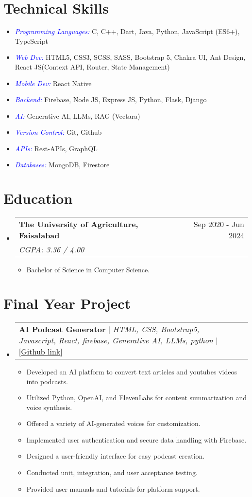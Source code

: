 \documentclass[letterpaper,11pt]{article}
\makeatletter
\newcommand{\resumeItem}[1]{
  \item\small{
    {#1 \vspace{-2pt}}
  }
}
\newcommand{\resumeSubheading}[4]{
  \vspace{-2pt}\item
    \begin{tabular*}{0.97\textwidth}[t]{l@{\extracolsep{\fill}}r}
      \textbf{#1} & #2 \\
      \textit{\small#3} & \textit{\small #4} \\
    \end{tabular*}\vspace{-7pt}
}
\newcommand{\resumeProjectHeading}[2]{
    \item
    \begin{tabular*}{0.97\textwidth}{l@{\extracolsep{\fill}}r}
      \small#1 & #2 \\
    \end{tabular*}\vspace{-7pt}
}
\newcommand{\resumeSubHeadingListStart}{\begin{itemize}[leftmargin=0.15in, label={}]}
\newcommand{\resumeSubHeadingListEnd}{\end{itemize}}
\newcommand{\resumeItemListStart}{\begin{itemize}}
\newcommand{\resumeItemListEnd}{\end{itemize}\vspace{-5pt}}
\makeatother
\begin{document}
\section{\textbf{Technical Skills}}
\resumeItemListStart
\resumeItem{\textcolor{blue}{\itshape \textcolor{blue}{\itshape Programming Languages:}}{ C, C++, Dart, Java, Python, JavaScript (ES6+), TypeScript } \\}
\resumeItem{\textcolor{blue}{\itshape Web Dev:}{ HTML5, CSS3, SCSS, SASS, Bootstrap 5, Chakra UI, Ant Design, React JS(Context API, Router, State Management)} \\}
\resumeItem{\textcolor{blue}{\itshape Mobile Dev:}{ React Native} \\}
\resumeItem{\textcolor{blue}{\itshape Backend:}{ Firebase, Node JS, Express JS, Python, Flask, Django} \\}
\resumeItem{\textcolor{blue}{\itshape AI:}{ Generative AI, LLMs, RAG (Vectara)} \\}
\resumeItem{\textcolor{blue}{\itshape Version Control:}{ Git, Github} \\}
\resumeItem{\textcolor{blue}{\itshape APIs:}{ Rest-APIs, GraphQL} \\}
\resumeItem{\textcolor{blue}{\itshape Databases:}{ MongoDB, Firestore}\\}
\resumeItemListEnd
%

\section{\textbf{Education}}
\resumeSubHeadingListStart
\resumeSubheading
{The University of Agriculture, Faisalabad}{Sep 2020 - Jun 2024}
{CGPA: 3.36 / 4.00}{}
{}{}
\resumeItemListStart
\resumeItem{Bachelor of Science in Computer Science.}
\resumeItemListEnd
\resumeSubHeadingListEnd

\section{\textbf{Final Year Project}}
\resumeSubHeadingListStart

\resumeProjectHeading
{\textbf{{AI Podcast Generator}} $|$ \emph{HTML, CSS, Bootstrap5, Javascript, React, firebase, Generative AI, LLMs, python} $|$ [{\href{https://github.com/Ahmadjajja/AIpodcastgenerator}{\underline{Github link}}}]} {}
\resumeItemListStart
\resumeItem{Developed an AI platform to convert text articles and youtubes videos into podcasts.}
\resumeItem{Utilized Python, OpenAI, and ElevenLabs for content summarization and voice synthesis.}
\resumeItem{Offered a variety of AI-generated voices for customization.}
\resumeItem{Implemented user authentication and secure data handling with Firebase.}
\resumeItem{Designed a user-friendly interface for easy podcast creation.}
\resumeItem{Conducted unit, integration, and user acceptance testing.}
\resumeItem{Provided user manuals and tutorials for platform support.}
\resumeItemListEnd
\resumeSubHeadingListEnd
\end{document}
